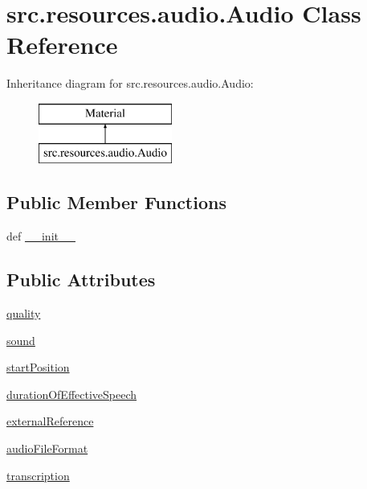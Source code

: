 \hypertarget{classsrc_1_1resources_1_1audio_1_1_audio}{\section{src.\+resources.\+audio.\+Audio Class Reference}
\label{classsrc_1_1resources_1_1audio_1_1_audio}
}
Inheritance diagram for src.\+resources.\+audio.\+Audio\+:\begin{figure}[H]
\begin{center}
\leavevmode
\includegraphics[height=2.000000cm]{classsrc_1_1resources_1_1audio_1_1_audio}
\end{center}
\end{figure}
\subsection*{Public Member Functions}
\begin{DoxyCompactItemize}
\item 
def \hyperlink{classsrc_1_1resources_1_1audio_1_1_audio_af81ebf2e8ce309279b44a7aba68563e9}{\+\_\+\+\_\+init\+\_\+\+\_\+}
\end{DoxyCompactItemize}
\subsection*{Public Attributes}
\begin{DoxyCompactItemize}
\item 
\hyperlink{classsrc_1_1resources_1_1audio_1_1_audio_a8ec1034a29b3c55692fae3be07f54605}{quality}
\item 
\hyperlink{classsrc_1_1resources_1_1audio_1_1_audio_a549dd2605f3d2d09ca8a8618ddf34fc9}{sound}
\item 
\hyperlink{classsrc_1_1resources_1_1audio_1_1_audio_a8d782bb99c64c395286d7f71a8c2ebf8}{start\+Position}
\item 
\hyperlink{classsrc_1_1resources_1_1audio_1_1_audio_a0d0e84fdb0fd8961b8c033dc8d9782ac}{duration\+Of\+Effective\+Speech}
\item 
\hyperlink{classsrc_1_1resources_1_1audio_1_1_audio_ac1da212e2eea3e4fa6ddb5f48c7364c2}{external\+Reference}
\item 
\hyperlink{classsrc_1_1resources_1_1audio_1_1_audio_aadc41b28801de70ba866a40892dce32c}{audio\+File\+Format}
\item 
\hyperlink{classsrc_1_1resources_1_1audio_1_1_audio_aef44fd13d82cd3f79150c76b9b6f4c3e}{transcription}
\end{DoxyCompactItemize}


